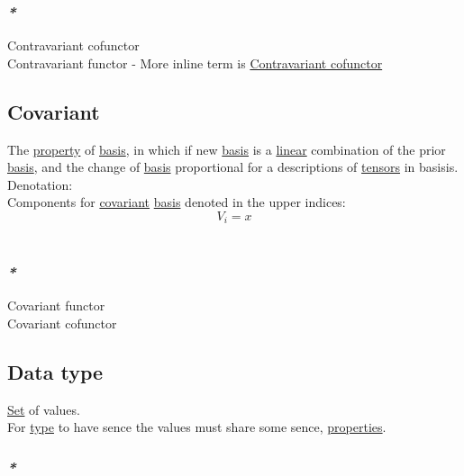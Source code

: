 \documentclass[11pt]{article}
\begin{document}
\subsubsection{\emph{*}}
\label{sec:org79d1102}

\label{org2715d8c}Contravariant cofunctor\\
\label{orge5e36a5}Contravariant functor - More inline term is \hyperref[org2715d8c]{Contravariant cofunctor}\\

\subsection{\label{org71a3b16}Covariant}
\label{sec:org95f8108}
The \hyperref[orgf8c3cc7]{property} of \hyperref[org27d3d18]{basis}, in which if new \hyperref[org27d3d18]{basis} is a \hyperref[orgbbe89e9]{linear} combination of the prior \hyperref[org27d3d18]{basis}, and the change of \hyperref[org27d3d18]{basis} proportional for a descriptions of \hyperref[orgafb2e6d]{tensors} in basisis.\\

Denotation:\\
Components for \hyperref[org71a3b16]{covariant} \hyperref[org27d3d18]{basis} denoted in the upper indices:\\
$$ V_{i} = x $$\\

\subsubsection{\emph{*}}
\label{sec:org863c001}

\label{orgf6f99b5}Covariant functor\\
\label{org4d11440}Covariant cofunctor\\

\subsection{\label{org212d9c3}Data type}
\label{sec:org8906a3e}
\hyperref[org1faf06d]{Set} of values.\\
For \hyperref[orgc4aea2f]{type} to have sence the values must share some sence, \hyperref[org85fb3a1]{properties}.\\

\subsubsection{\emph{*}}
\label{sec:orga13a4c4}
\end{document}
